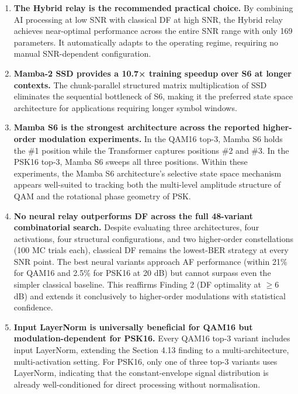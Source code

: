 \begin{enumerate}
\item
  \textbf{The Hybrid relay is the recommended practical choice.} By combining AI processing at low SNR with classical DF at high SNR, the Hybrid relay achieves near-optimal performance across the entire SNR range with only 169 parameters. It automatically adapts to the operating regime, requiring no manual SNR-dependent configuration.
\item
  \textbf{Mamba-2 SSD provides a 10.7× training speedup over S6 at longer contexts.} The chunk-parallel structured matrix multiplication of SSD eliminates the sequential bottleneck of S6, making it the preferred state space architecture for applications requiring longer symbol windows.
\item
  \textbf{Mamba S6 is the strongest architecture across the reported higher-order modulation experiments.} In the QAM16 top-3, Mamba S6 holds the \#1 position while the Transformer captures positions \#2 and \#3. In the PSK16 top-3, Mamba S6 sweeps all three positions. Within these experiments, the Mamba S6 architecture's selective state space mechanism appears well-suited to tracking both the multi-level amplitude structure of QAM and the rotational phase geometry of PSK.
\item
  \textbf{No neural relay outperforms DF across the full 48-variant combinatorial search.} Despite evaluating three architectures, four activations, four structural configurations, and two higher-order constellations (100 MC trials each), classical DF remains the lowest-BER strategy at every SNR point. The best neural variants approach AF performance (within 21\% for QAM16 and 2.5\% for PSK16 at 20 dB) but cannot surpass even the simpler classical baseline. This reaffirms Finding 2 (DF optimality at $\geq$6 dB) and extends it conclusively to higher-order modulations with statistical confidence.
\item
  \textbf{Input LayerNorm is universally beneficial for QAM16 but modulation-dependent for PSK16.} Every QAM16 top-3 variant includes input LayerNorm, extending the Section 4.13 finding to a multi-architecture, multi-activation setting. For PSK16, only one of three top-3 variants uses LayerNorm, indicating that the constant-envelope signal distribution is already well-conditioned for direct processing without normalisation.
\end{enumerate}



